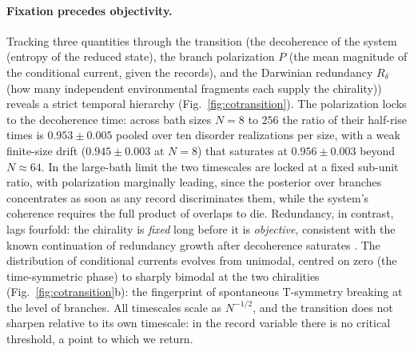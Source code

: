 \documentclass[11pt]{article}
\begin{document}
\paragraph{Fixation precedes objectivity.}
Tracking three quantities through the transition (the decoherence of the system (entropy of the reduced state), the branch polarization $P$ (the mean magnitude of the conditional current, given the records), and the Darwinian redundancy $R_\delta$ (how many independent environmental fragments each supply the chirality)) reveals a strict temporal hierarchy (Fig.~\ref{fig:cotransition}). The polarization locks to the decoherence time: across bath sizes $N=8$ to $256$ the ratio of their half-rise times is $0.953\pm0.005$ pooled over ten disorder realizations per size, with a weak finite-size drift ($0.945\pm0.003$ at $N=8$) that saturates at $0.956\pm0.003$ beyond $N\approx64$. In the large-bath limit the two timescales are locked at a fixed sub-unit ratio, with polarization marginally leading, since the posterior over branches concentrates as soon as any record discriminates them, while the system's coherence requires the full product of overlaps to die. Redundancy, in contrast, lags fourfold: the chirality is \emph{fixed} long before it is \emph{objective}, consistent with the known continuation of redundancy growth after decoherence saturates \cite{Riedel2012}. The distribution of conditional currents evolves from unimodal, centred on zero (the time-symmetric phase) to sharply bimodal at the two chiralities (Fig.~\ref{fig:cotransition}b): the fingerprint of spontaneous T-symmetry breaking at the level of branches. All timescales scale as $N^{-1/2}$, and the transition does not sharpen relative to its own timescale: in the record variable there is no critical threshold, a point to which we return.
\end{document}
